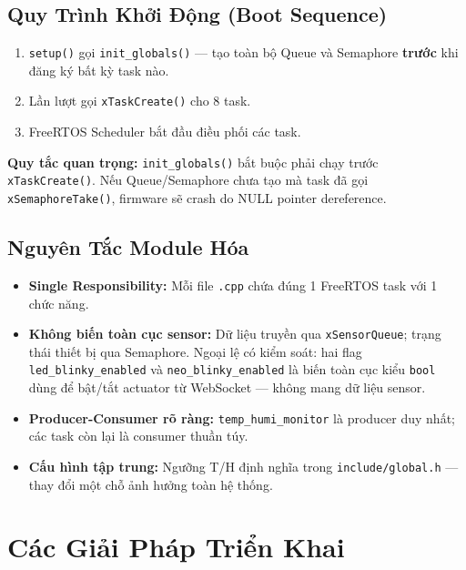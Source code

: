 \documentclass[12pt,a4paper]{article}
\begin{document}
\subsection{Quy Trình Khởi Động (Boot Sequence)}

\begin{enumerate}
    \item \texttt{setup()} gọi \texttt{init\_globals()} — tạo toàn bộ Queue và Semaphore \textbf{trước} khi đăng ký bất kỳ task nào.
    \item Lần lượt gọi \texttt{xTaskCreate()} cho 8 task.
    \item FreeRTOS Scheduler bắt đầu điều phối các task.
\end{enumerate}

\textbf{Quy tắc quan trọng:} \texttt{init\_globals()} bắt buộc phải chạy trước \texttt{xTaskCreate()}. Nếu Queue/Semaphore chưa tạo mà task đã gọi \texttt{xSemaphoreTake()}, firmware sẽ crash do NULL pointer dereference.

\subsection{Nguyên Tắc Module Hóa}

\begin{itemize}
    \item \textbf{Single Responsibility:} Mỗi file \texttt{.cpp} chứa đúng 1 FreeRTOS task với 1 chức năng.
    \item \textbf{Không biến toàn cục sensor:} Dữ liệu truyền qua \texttt{xSensorQueue}; trạng thái thiết bị qua Semaphore. Ngoại lệ có kiểm soát: hai flag \texttt{led\_blinky\_enabled} và \texttt{neo\_blinky\_enabled} là biến toàn cục kiểu \texttt{bool} dùng để bật/tắt actuator từ WebSocket — không mang dữ liệu sensor.
    \item \textbf{Producer-Consumer rõ ràng:} \texttt{temp\_humi\_monitor} là producer duy nhất; các task còn lại là consumer thuần túy.
    \item \textbf{Cấu hình tập trung:} Ngưỡng T/H định nghĩa trong \texttt{include/global.h} — thay đổi một chỗ ảnh hưởng toàn hệ thống.
\end{itemize}


\section{Các Giải Pháp Triển Khai}
\end{document}
